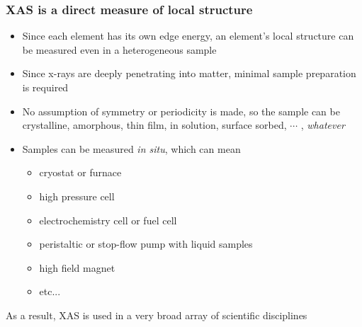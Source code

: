 \documentclass[10pt, xcolor=x11names, compress]{beamer}
\begin{document}
\begin{frame}
  \frametitle{XAS is a direct measure of local structure}

  \begin{itemize}
  \item Since each element has its own edge energy, an element's
    local structure can be measured even in a heterogeneous sample
  \item Since x-rays are deeply penetrating into matter, minimal
    sample preparation is required
  \item No assumption of symmetry or periodicity is made, so the
    sample can be crystalline, amorphous, thin film, in solution,
    surface sorbed, $\cdots$ , \textit{whatever}
  \item Samples can be measured \textit{in situ}, which can mean
    \begin{itemize}
    \item cryostat or furnace
    \item high pressure cell
    \item electrochemistry cell or fuel cell
    \item peristaltic or stop-flow pump with liquid samples
    \item high field magnet
    \item etc...
    \end{itemize}
  \end{itemize}

  \begin{exampleblock}{}
    \begin{center}
      As a result, XAS is used in a very broad array of scientific
      disciplines
    \end{center}
  \end{exampleblock}


\end{frame}
\end{document}
